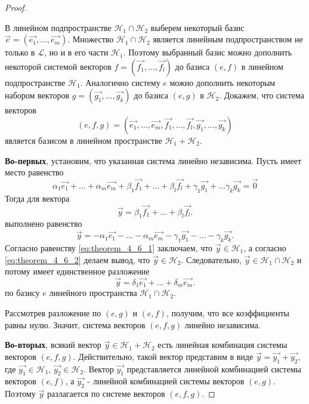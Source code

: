 \begin{proof}~

    В линейном подпространстве $\mathcal{H}_1 \cap \mathcal{H}_2$ выберем некоторый базис $\vec{e} = (\vec{e_1}, \ldots, \vec{e_m})$. Множество $\mathcal{H}_1 \cap \mathcal{H}_2$ является линейным подпространством не только в $\mathcal{L}$, но и в его части $\mathcal{H}_1$. Поэтому выбранный базис можно дополнить некоторой системой векторов $f = (\vec{f_1}, \ldots, \vec{f_l})$ до базиса $(e, f)$ в линейном подпространстве $\mathcal{H}_1$. Аналогично систему $e$ можно дополнить некоторым набором векторов $g = (\vec{g_1}, \ldots, \vec{g_k})$ до базиса $(e, g)$ в $\mathcal{H}_2$. Докажем, что система векторов
    $$(e, f, g) = (\vec{e_1}, \ldots, \vec{e_m}, \vec{f_1}, \ldots, \vec{f_l}, \vec{g_1}, \ldots, \vec{g_k})$$
    является базисом в линейном пространстве $\mathcal{H}_1 + \mathcal{H}_2$.

    \textbf{Во-первых}, установим, что указанная система линейно независима. Пусть имеет место равенство
    $$\alpha_1\vec{e_1} + \ldots + \alpha_m\vec{e_m} + \beta_1\vec{f_1} + \ldots + \beta_l\vec{f_l} + \gamma_1\vec{g_1} + \ldots \gamma_k\vec{g_k} = \vec{0}$$
    Тогда для вектора
    \begin{equation}
        \vec{y} = \beta_1\vec{f_1} + \ldots + \beta_l\vec{f_l}.
        \label{eq:theorem_4_6_1}
    \end{equation}
    выполнено равенство
    \begin{equation}
        \vec{y} = -\alpha_1\vec{e_1} - \ldots -\alpha_m\vec{e_m} - \gamma_1\vec{g_1} - \ldots - \gamma_k\vec{g_k}.
        \label{eq:theorem_4_6_2}
    \end{equation}
    Согласно равенству \eqref{eq:theorem_4_6_1} заключаем, что $\vec{y} \in \mathcal{H}_1$, а согласно \eqref{eq:theorem_4_6_2} делаем вывод, что $\vec{y} \in \mathcal{H}_2$. Следовательно, $\vec{y} \in \mathcal{H}_1 \cap \mathcal{H}_2$ и потому имеет единственное разложение
    \begin{equation}
        \vec{y} = \delta_1\vec{e_1} + \ldots + \delta_m\vec{e_m}.
        \label{fig:theorem_4_6_3}
    \end{equation}
    по базису $e$ линейного пространства $\mathcal{H}_1 \cap \mathcal{H}_2$.

    Рассмотрев разложение по $(e, g)$ и $(e, f)$, получим, что все коэффициенты равны нулю. Значит, система векторов $(e, f, g)$ линейно независима.

    \textbf{Во-вторых}, всякий вектор $\vec{y} \in \mathcal{H}_1 + \mathcal{H}_2$ есть линейная комбинация системы векторов $(e, f, g)$. Действительно, такой вектор представим в виде $\vec{y} = \vec{y_1} + \vec{y_2}$, где $\vec{y_1} \in \mathcal{H}_1$, $\vec{y_2} \in \mathcal{H}_2$. Вектор $\vec{y_1}$ представляется линейной комбинацией системы векторов $(e, f)$, а $\vec{y_2}$ - линейной комбинацией системы векторов $(e, g)$. Поэтому $\vec{y}$ разлагается по системе векторов $(e, f, g)$.


\end{proof}
